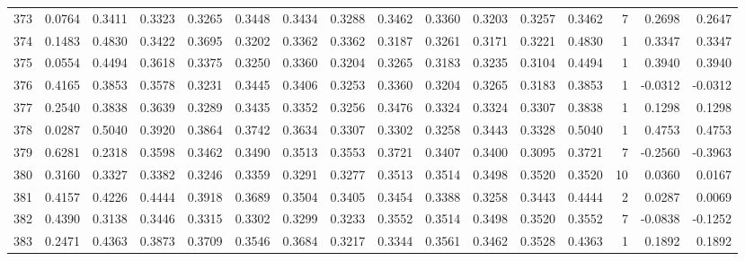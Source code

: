 \begin{tabular}{lrrrrrrrrrrrrrrr}
373 &      0.0764 &  0.3411 &  0.3323 &  0.3265 &  0.3448 &  0.3434 &  0.3288 &  0.3462 &  0.3360 &  0.3203 &   0.3257 &     0.3462 &      7 &                    0.2698 &                     0.2647 \\
374 &      0.1483 &  0.4830 &  0.3422 &  0.3695 &  0.3202 &  0.3362 &  0.3362 &  0.3187 &  0.3261 &  0.3171 &   0.3221 &     0.4830 &      1 &                    0.3347 &                     0.3347 \\
375 &      0.0554 &  0.4494 &  0.3618 &  0.3375 &  0.3250 &  0.3360 &  0.3204 &  0.3265 &  0.3183 &  0.3235 &   0.3104 &     0.4494 &      1 &                    0.3940 &                     0.3940 \\
376 &      0.4165 &  0.3853 &  0.3578 &  0.3231 &  0.3445 &  0.3406 &  0.3253 &  0.3360 &  0.3204 &  0.3265 &   0.3183 &     0.3853 &      1 &                   -0.0312 &                    -0.0312 \\
377 &      0.2540 &  0.3838 &  0.3639 &  0.3289 &  0.3435 &  0.3352 &  0.3256 &  0.3476 &  0.3324 &  0.3324 &   0.3307 &     0.3838 &      1 &                    0.1298 &                     0.1298 \\
378 &      0.0287 &  0.5040 &  0.3920 &  0.3864 &  0.3742 &  0.3634 &  0.3307 &  0.3302 &  0.3258 &  0.3443 &   0.3328 &     0.5040 &      1 &                    0.4753 &                     0.4753 \\
379 &      0.6281 &  0.2318 &  0.3598 &  0.3462 &  0.3490 &  0.3513 &  0.3553 &  0.3721 &  0.3407 &  0.3400 &   0.3095 &     0.3721 &      7 &                   -0.2560 &                    -0.3963 \\
380 &      0.3160 &  0.3327 &  0.3382 &  0.3246 &  0.3359 &  0.3291 &  0.3277 &  0.3513 &  0.3514 &  0.3498 &   0.3520 &     0.3520 &     10 &                    0.0360 &                     0.0167 \\
381 &      0.4157 &  0.4226 &  0.4444 &  0.3918 &  0.3689 &  0.3504 &  0.3405 &  0.3454 &  0.3388 &  0.3258 &   0.3443 &     0.4444 &      2 &                    0.0287 &                     0.0069 \\
382 &      0.4390 &  0.3138 &  0.3446 &  0.3315 &  0.3302 &  0.3299 &  0.3233 &  0.3552 &  0.3514 &  0.3498 &   0.3520 &     0.3552 &      7 &                   -0.0838 &                    -0.1252 \\
383 &      0.2471 &  0.4363 &  0.3873 &  0.3709 &  0.3546 &  0.3684 &  0.3217 &  0.3344 &  0.3561 &  0.3462 &   0.3528 &     0.4363 &      1 &                    0.1892 &                     0.1892 \\

\end{tabular}
